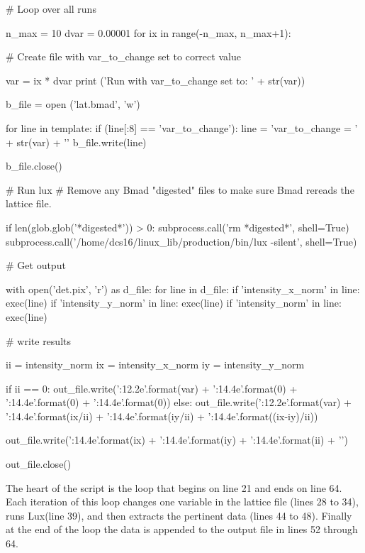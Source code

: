 \documentclass[11pt]{article}
\newcommand{\lux}{Lux\xspace}
\begin{document}
{{{{{{{{{{{{{{{{{\begin{listing}{1}
# Loop over all runs

n_max = 10
dvar = 0.00001
for ix in range(-n_max, n_max+1):

  # Create file with var_to_change set to correct value

  var = ix * dvar
  print ('Run with var_to_change set to: ' + str(var))

  b_file = open ('lat.bmad', 'w')

  for line in template:
    if (line[:8] == 'var_to_change'): line = 'var_to_change = ' + str(var) + '\n'
    b_file.write(line)

  b_file.close()

  # Run lux
  # Remove any Bmad "digested" files to make sure Bmad rereads the lattice file.

  if len(glob.glob('*digested*')) > 0: subprocess.call('rm *digested*', shell=True)
  subprocess.call('/home/dcs16/linux_lib/production/bin/lux -silent', shell=True)

  # Get output

  with open('det.pix', 'r') as d_file:
    for line in d_file:
      if 'intensity_x_norm' in line: exec(line)
      if 'intensity_y_norm' in line: exec(line)
      if 'intensity_norm' in line: exec(line)

  # write results

  ii = intensity_norm
  ix = intensity_x_norm
  iy = intensity_y_norm

  if ii == 0:
    out_file.write('{:12.2e}'.format(var) + '{:14.4e}'.format(0) + 
                   '{:14.4e}'.format(0) + '{:14.4e}'.format(0))
  else:
    out_file.write('{:12.2e}'.format(var) + '{:14.4e}'.format(ix/ii) + 
                   '{:14.4e}'.format(iy/ii) + '{:14.4e}'.format((ix-iy)/ii))

  out_file.write('{:14.4e}'.format(ix) + '{:14.4e}'.format(iy) + 
                 '{:14.4e}'.format(ii) + '\n')

out_file.close()
\end{listing}

The heart of the script is the loop that begins on line 21 and ends on
line 64. Each iteration of this loop changes one variable in the
lattice file (lines 28 to 34), runs \lux (line 39), and then extracts
the pertinent data (lines 44 to 48). Finally at the end of the loop
the data is appended to the output file in lines 52 through 64.


}}}}}}}}}}}}}}}}}
\end{document}
